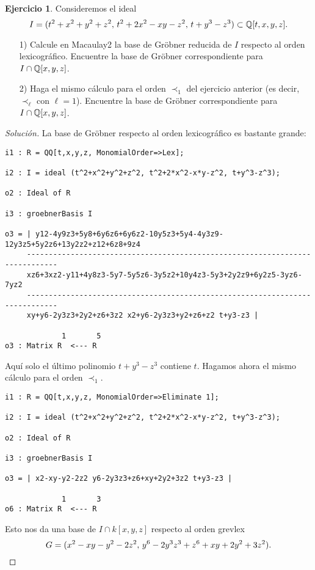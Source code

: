 \documentclass{article}
\theoremstyle{definition}
\newtheorem{ejerc}{Ejercicio}
\newenvironment{solucion}{\begin{proof}[Solución]}{\end{proof}}
\begin{document}
\begin{ejerc}
  Consideremos el ideal
  $$I = (t^2 + x^2 + y^2 + z^2, \, t^2 + 2 x^2 - xy - z^2, \, t + y^3 - z^3) \subset \mathbb{Q} [t,x,y,z].$$

  \begin{enumerate}
  \item[1)] Calcule en Macaulay2 la base de Gröbner reducida de $I$ respecto al
    orden lexicográfico. Encuentre la base de Gröbner correspondiente para
    $I \cap \mathbb{Q} [x,y,z]$.

  \item[2)] Haga el mismo cálculo para el orden $\prec_1$ del ejercicio anterior
    (es decir, $\prec_\ell$ con $\ell = 1$). Encuentre la base de Gröbner
    correspondiente para $I \cap \mathbb{Q} [x,y,z]$.
  \end{enumerate}

  \ifdefined\solutions\begin{solucion}
    La base de Gröbner respecto al orden lexicográfico es bastante grande:

    \begin{framed}\small
\begin{verbatim}
i1 : R = QQ[t,x,y,z, MonomialOrder=>Lex];

i2 : I = ideal (t^2+x^2+y^2+z^2, t^2+2*x^2-x*y-z^2, t+y^3-z^3);

o2 : Ideal of R

i3 : groebnerBasis I

o3 = | y12-4y9z3+5y8+6y6z6+6y6z2-10y5z3+5y4-4y3z9-12y3z5+5y2z6+13y2z2+z12+6z8+9z4
     -----------------------------------------------------------------------------
     xz6+3xz2-y11+4y8z3-5y7-5y5z6-3y5z2+10y4z3-5y3+2y2z9+6y2z5-3yz6-7yz2
     -----------------------------------------------------------------------------
     xy+y6-2y3z3+2y2+z6+3z2 x2+y6-2y3z3+y2+z6+z2 t+y3-z3 |

             1       5
o3 : Matrix R  <--- R
\end{verbatim}
    \end{framed}

    Aquí solo el último polinomio $t+y^3-z^3$ contiene $t$. Hagamos ahora el
    mismo cálculo para el orden $\prec_1$.

    \begin{framed}\small
\begin{verbatim}
i1 : R = QQ[t,x,y,z, MonomialOrder=>Eliminate 1];

i2 : I = ideal (t^2+x^2+y^2+z^2, t^2+2*x^2-x*y-z^2, t+y^3-z^3);

o2 : Ideal of R

i3 : groebnerBasis I

o3 = | x2-xy-y2-2z2 y6-2y3z3+z6+xy+2y2+3z2 t+y3-z3 |

             1       3
o6 : Matrix R  <--- R
\end{verbatim}
    \end{framed}

    Esto nos da una base de $I \cap k[x,y,z]$ respecto al orden grevlex
    \[ G = (x^2-xy-y^2-2z^2, \, y^6-2y^3z^3+z^6+xy+2y^2+3z^2). \qedhere \]
  \end{solucion}\fi
\end{ejerc}
\end{document}
